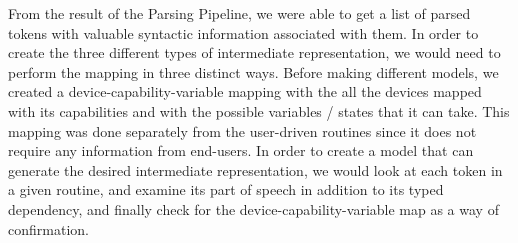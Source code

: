 From the result of the Parsing Pipeline, we were able to get a list of parsed tokens with valuable syntactic information associated with them. In order to create the three different types of intermediate representation, we would need to perform the mapping in three distinct ways. Before making different models, we created a device-capability-variable mapping with the all the devices mapped with its capabilities and with the possible variables / states that it can take. This mapping was done separately from the user-driven routines since it does not require any information from end-users. In order to create a model that can generate the desired intermediate representation, we would look at each token in a given routine, and examine its part of speech in addition to its typed dependency, and finally check for the device-capability-variable map as a way of confirmation.




